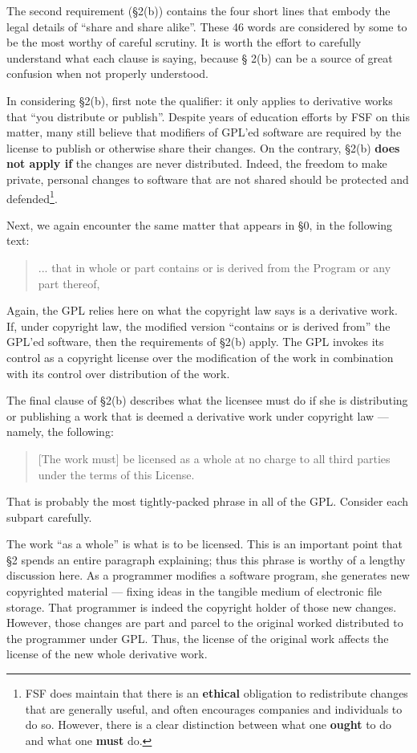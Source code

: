 \documentclass[12pt]{report}
\begin{document}
\medskip

The second requirement (\S 2(b)) contains the four short lines that embody
the legal details of ``share and share alike''.  These 46 words are
considered by some to be the most worthy of careful scrutiny.  It is worth
the effort to carefully understand what each clause is saying, because \S
2(b) can be a source of great confusion when not properly understood.

In considering \S 2(b), first note the qualifier: it only applies to
derivative works that ``you distribute or publish''.  Despite years of
education efforts by FSF on this matter, many still believe that modifiers
of GPL'ed software are required by the license to publish or otherwise
share their changes.  On the contrary, \S 2(b) {\bf does not apply if} the
changes are never distributed.  Indeed, the freedom to make private,
personal changes to software that are not shared should be protected and
defended\footnote{FSF does maintain that there is an {\bf ethical}
  obligation to redistribute changes that are generally useful, and often
  encourages companies and individuals to do so.  However, there is a
  clear distinction between what one {\bf ought} to do and what one {\bf
    must} do.}.

Next, we again encounter the same matter that appears in \S 0, in the
following text:
\begin{quote}
... that in whole or part contains or is derived from the Program or any
  part thereof,
\end{quote}
Again, the GPL relies here on what the copyright law says is a derivative
work.  If, under copyright law, the modified version ``contains or is
derived from'' the GPL'ed software, then the requirements of \S 2(b)
apply.  The GPL invokes its control as a copyright license over the
modification of the work in combination with its control over distribution
of the work.

The final clause of \S 2(b) describes what the licensee must do if she is
distributing or publishing a work that is deemed a derivative work under
copyright law --- namely, the following:
\begin{quote}
[The work must] be licensed as a whole at no charge to all third parties
under the terms of this License.
\end{quote}
That is probably the most tightly-packed phrase in all of the GPL\@.
Consider each subpart carefully.

The work ``as a whole'' is what is to be licensed.  This is an important
point that \S 2 spends an entire paragraph explaining; thus this phrase is
worthy of a lengthy discussion here.  As a programmer modifies a software
program, she generates new copyrighted material --- fixing ideas in the
tangible medium of electronic file storage.  That programmer is indeed the
copyright holder of those new changes.  However, those changes are part
and parcel to the original worked distributed to the programmer under
GPL\@.  Thus, the license of the original work affects the license of the
new whole derivative work.
\end{document}
